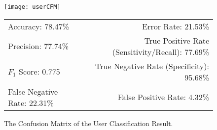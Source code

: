 \begin{figure}[!h]
	\centering
	\begin{minipage}{.45\linewidth}
		\texttt{[image: userCFM]}
		\vspace{.05in}
	\end{minipage}
	
	\centering
	\begin{tabular}{lr}
		\toprule
		Accuracy: 78.47\% & \hspace{-.55in} Error Rate: 21.53\% \\
		Precision: 77.74\% & \hspace{-.55in} True Positive Rate (Sensitivity/Recall): 77.69\% \\
		$F_1$ Score: 0.775 & \hspace{-.55in} True Negative Rate (Specificity): 95.68\% \\
		False Negative Rate: 22.31\% & \hspace{-.55in} False Positive Rate: 4.32\% \\
		\bottomrule
	\end{tabular}
	\caption{The Confusion Matrix of the User Classification Result.
	}
	\label{fig:userCFM}
\end{figure}

